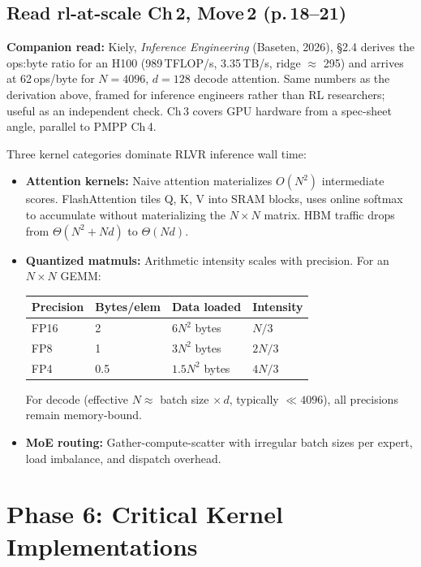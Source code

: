 \documentclass[11pt, letterpaper]{article}
\begin{document}
\subsection{Read rl-at-scale Ch\,2, Move\,2 (p.\,18--21)}

\textbf{Companion read:} Kiely, \textit{Inference Engineering} (Baseten, 2026), \S2.4 derives the ops:byte ratio for an H100 (989\,TFLOP/s, 3.35\,TB/s, ridge $\approx$ 295) and arrives at 62\,ops/byte for $N=4096$, $d=128$ decode attention. Same numbers as the derivation above, framed for inference engineers rather than RL researchers; useful as an independent check. Ch\,3 covers GPU hardware from a spec-sheet angle, parallel to PMPP Ch\,4.

Three kernel categories dominate RLVR inference wall time:
\begin{itemize}
\item \textbf{Attention kernels:} Naive attention materializes $O(N^2)$ intermediate scores. FlashAttention tiles Q, K, V into SRAM blocks, uses online softmax to accumulate without materializing the $N \times N$ matrix. HBM traffic drops from $\Theta(N^2 + Nd)$ to $\Theta(Nd)$.
\item \textbf{Quantized matmuls:} Arithmetic intensity scales with precision. For an $N \times N$ GEMM:

\smallskip
\begin{tabularx}{0.85\textwidth}{@{}llll@{}}
\toprule
\textbf{Precision} & \textbf{Bytes/elem} & \textbf{Data loaded} & \textbf{Intensity} \\
\midrule
FP16 & 2 & $6N^2$ bytes & $N/3$ \\
FP8 & 1 & $3N^2$ bytes & $2N/3$ \\
FP4 & 0.5 & $1.5N^2$ bytes & $4N/3$ \\
\bottomrule
\end{tabularx}

\smallskip
For decode (effective $N \approx$ batch size $\times\, d$, typically $\ll 4096$), all precisions remain memory-bound.
\item \textbf{MoE routing:} Gather-compute-scatter with irregular batch sizes per expert, load imbalance, and dispatch overhead.
\end{itemize}

\section{Phase 6: Critical Kernel Implementations}
\end{document}
